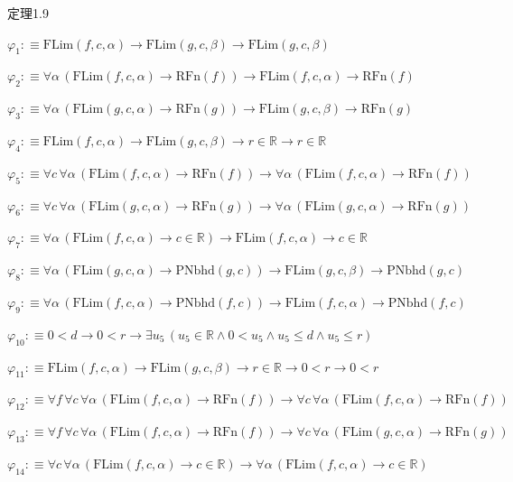 \begin{fullproof}{定理1.9}
\begin{ptree}
\end{ptree}
\begin{abbrevlist}
\item $\varphi_{1} :\equiv \mathrm{FLim}(f,c,\alpha) \to \mathrm{FLim}(g,c,\beta) \to \mathrm{FLim}(g,c,\beta)$
\item $\varphi_{2} :\equiv \forall \alpha\,(\mathrm{FLim}(f,c,\alpha) \to \mathrm{RFn}(f)) \to \mathrm{FLim}(f,c,\alpha) \to \mathrm{RFn}(f)$
\item $\varphi_{3} :\equiv \forall \alpha\,(\mathrm{FLim}(g,c,\alpha) \to \mathrm{RFn}(g)) \to \mathrm{FLim}(g,c,\beta) \to \mathrm{RFn}(g)$
\item $\varphi_{4} :\equiv \mathrm{FLim}(f,c,\alpha) \to \mathrm{FLim}(g,c,\beta) \to r \in \mathbb{R} \to r \in \mathbb{R}$
\item $\varphi_{5} :\equiv \forall c\,\forall \alpha\,(\mathrm{FLim}(f,c,\alpha) \to \mathrm{RFn}(f)) \to \forall \alpha\,(\mathrm{FLim}(f,c,\alpha) \to \mathrm{RFn}(f))$
\item $\varphi_{6} :\equiv \forall c\,\forall \alpha\,(\mathrm{FLim}(g,c,\alpha) \to \mathrm{RFn}(g)) \to \forall \alpha\,(\mathrm{FLim}(g,c,\alpha) \to \mathrm{RFn}(g))$
\item $\varphi_{7} :\equiv \forall \alpha\,(\mathrm{FLim}(f,c,\alpha) \to c \in \mathbb{R}) \to \mathrm{FLim}(f,c,\alpha) \to c \in \mathbb{R}$
\item $\varphi_{8} :\equiv \forall \alpha\,(\mathrm{FLim}(g,c,\alpha) \to \mathrm{PNbhd}(g,c)) \to \mathrm{FLim}(g,c,\beta) \to \mathrm{PNbhd}(g,c)$
\item $\varphi_{9} :\equiv \forall \alpha\,(\mathrm{FLim}(f,c,\alpha) \to \mathrm{PNbhd}(f,c)) \to \mathrm{FLim}(f,c,\alpha) \to \mathrm{PNbhd}(f,c)$
\item $\varphi_{10} :\equiv 0 < d \to 0 < r \to \exists u_{5}\,(u_{5} \in \mathbb{R} \land 0 < u_{5} \land u_{5} \leq d \land u_{5} \leq r)$
\item $\varphi_{11} :\equiv \mathrm{FLim}(f,c,\alpha) \to \mathrm{FLim}(g,c,\beta) \to r \in \mathbb{R} \to 0 < r \to 0 < r$
\item $\varphi_{12} :\equiv \forall f\,\forall c\,\forall \alpha\,(\mathrm{FLim}(f,c,\alpha) \to \mathrm{RFn}(f)) \to \forall c\,\forall \alpha\,(\mathrm{FLim}(f,c,\alpha) \to \mathrm{RFn}(f))$
\item $\varphi_{13} :\equiv \forall f\,\forall c\,\forall \alpha\,(\mathrm{FLim}(f,c,\alpha) \to \mathrm{RFn}(f)) \to \forall c\,\forall \alpha\,(\mathrm{FLim}(g,c,\alpha) \to \mathrm{RFn}(g))$
\item $\varphi_{14} :\equiv \forall c\,\forall \alpha\,(\mathrm{FLim}(f,c,\alpha) \to c \in \mathbb{R}) \to \forall \alpha\,(\mathrm{FLim}(f,c,\alpha) \to c \in \mathbb{R})$

\end{abbrevlist}
\end{fullproof}
